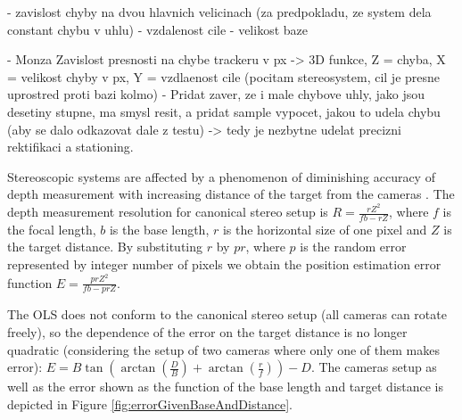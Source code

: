 - zavislost chyby na dvou hlavnich velicinach (za predpokladu, ze system dela constant chybu v uhlu)
	- vzdalenost cile
	- velikost baze

- Monza Zavislost presnosti na chybe trackeru v px -> 3D funkce, Z = chyba, X = velikost chyby v px, Y = vzdlaenost cile (pocitam stereosystem, cil je presne uprostred proti bazi kolmo)
- Pridat zaver, ze i male chybove uhly, jako jsou desetiny stupne, ma smysl resit, a pridat sample vypocet, jakou to udela chybu (aby se dalo odkazovat dale z testu) -> tedy je nezbytne udelat precizni rektifikaci a stationing.



Stereoscopic systems are affected by a phenomenon of diminishing accuracy of depth measurement with increasing distance of the target from the cameras \cite{Cyganek:2007:ICV:1214366}. The depth measurement resolution for canonical stereo setup is $R = \frac{rZ^{2}}{fb - rZ}$, where $f$ is the focal length, $b$ is the base length, $r$ is the horizontal size of one pixel and $Z$ is the target distance. By substituting $r$ by $pr$, where $p$ is the random error represented by integer number of pixels we obtain the position estimation error function $E = \frac{prZ^{2}}{fb - prZ}$.

The OLS does not conform to the canonical stereo setup (all cameras can rotate freely), so the dependence of the error on the target distance is no longer quadratic (considering the setup of two cameras where only one of them makes error): $E = B\tan(\arctan(\frac{D}{B}) + \arctan(\frac{r}{f})) - D$. The cameras setup as well as the error shown as the function of the base length and target distance is depicted in Figure \ref{fig:errorGivenBaseAndDistance}.

